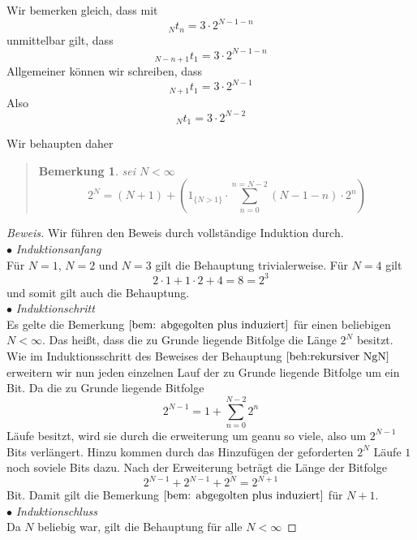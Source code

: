 \documentclass[11pt,oneside,a4paper]{scrreprt}
\newtheorem{bem}{Bemerkung}
\newenvironment{bew}{\begin{proof}[Beweis]}{\end{proof}}
\begin{document}
Wir bemerken gleich, dass mit 
	\begin{equation}\label{eqn:ntn gleich 3 mal 2 hoch N min n min 1}
	_Nt_n=3\cdot 2^{N-1-n}
	\end{equation}
 unmittelbar gilt, dass
\begin{equation}
_{N-n+1}t_1=3\cdot 2^{N-1-n}
\end{equation}
Allgemeiner können wir schreiben, dass
\begin{equation}
_{N+1}t_1=3\cdot 2^{N-1}
\end{equation}
Also 
\begin{equation}
_{N}t_1=3\cdot 2^{N-2}
\end{equation}

\noindent Wir behaupten daher
\begin{quote}
	\begin{bem}\label{bem: abgegolten plus induziert} sei $N<\infty$ 
\begin{equation}
2^{N} = \left(N+1\right)+\left( 1_{\{N>1\}}\cdot\sum_{n=0}^{n=N-2} (N-1-n) \cdot 2^n\right)
\end{equation}
	\end{bem}
\end{quote}

\begin{bew} Wir führen den Beweis durch vollständige Induktion durch.\\
\indent $\bullet$ \emph{Induktionsanfang}\\
Für $N=1$, $N=2$ und $N=3$ gilt die Behauptung trivialerweise. Für $N=4$ gilt
\begin{equation}
2\cdot1+1\cdot2+4 = 8 = 2^3
\end{equation}
und somit gilt auch  die Behauptung.\\
\indent $\bullet$ \emph{Induktionschritt}\\
Es gelte die Bemerkung $\ref{bem: abgegolten plus induziert}$  für einen beliebigen $N<\infty$. Das heißt, dass die zu Grunde liegende Bitfolge die Länge $2^N$ besitzt. Wie im Induktionsschritt des Beweises der Behauptung $\ref{beh:rekursiver NgN}$ erweitern wir nun jeden einzelnen Lauf der zu Grunde liegende Bitfolge um ein Bit. Da die zu Grunde liegende Bitfolge
\begin{equation}
2^{N-1} = 1+ \sum_{n=0}^{N-2}2^n
\end{equation}
Läufe besitzt, wird sie durch die erweiterung um geanu so viele, also um $2^{N-1}$ Bits verlängert. Hinzu kommen durch das Hinzufügen der geforderten $2^{N}$ Läufe $1$ noch soviele Bits dazu. Nach der Erweiterung beträgt die Länge der Bitfolge
\begin{equation}
2^{N-1}+2^{N-1}+2^N=2^{N+1}
\end{equation}
Bit. Damit gilt die Bemerkung  $\ref{bem: abgegolten plus induziert} $ für $N+1$.\\
\indent $\bullet$ \emph{Induktionschluss}\\
Da $N$ beliebig war, gilt die Behauptung für alle $N<\infty$
\end{bew}
\end{document}
